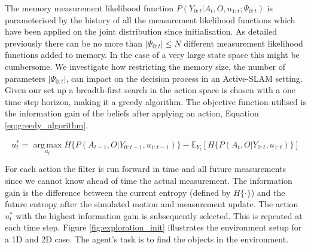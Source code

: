 The memory measurement likelihood function $P(Y_{0:t}|A_t,O,u_{1:t};\Psi_{0:t})$ is parameterised by the 
history of all the measurement likelihood functions which have been applied on the joint 
distribution since initialisation. As detailed previously there can be no more than $|\Psi_{0:t}| \leq N$ different measurement likelihood functions added to 
memory. In the case of a very large state space this might be cumbersome. We investigate how restricting the memory size, the number 
of parameters $|\Psi_{0:t}|$, can impact on the decision process in an Active-SLAM setting. Given our set up a breadth-first search in the action 
space is chosen with a one time step horizon, making it a greedy algorithm. The objective function utilised is the information
gain of the beliefs after applying an action, Equation \ref{eq:greedy_algorithm}.

\begin{equation}\label{eq:greedy_algorithm}
 u^*_{t} = \operatorname*{arg\,max}_{u_t} H\{P(A_{t-1},O|Y_{0:t-1},u_{1:t-1})\} - \mathbb{E}_{Y_t}\left[H\{P(A_{t},O|Y_{0:t},u_{1:t})\}\right]
\end{equation}

For each action the filter is run forward in time and all future measurements since we cannot know ahead of time the actual 
measurement. The information gain is the difference between the current entropy (defined 
by $H\{\cdot\}$) and the future entropy after the simulated motion and measurement update. The action $u^*_t$ with the highest information gain 
is subsequently selected. This is repeated at each time step. Figure \ref{fig:exploration_init} illustrates the environment setup for 
a 1D and 2D case. The agent's task is to find the objects in the environment.


